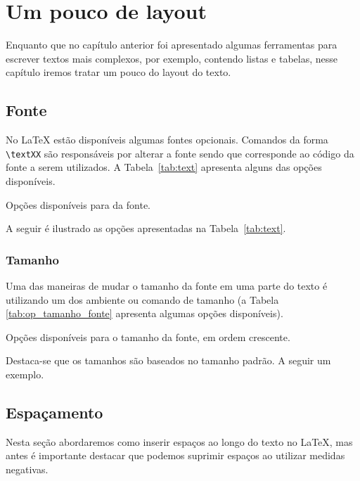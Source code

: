 \chapter{Um pouco de layout}
Enquanto que no capítulo anterior foi apresentado algumas ferramentas para
escrever textos mais complexos, por exemplo, contendo listas e tabelas, nesse
capítulo iremos tratar um pouco do layout do texto.

\section{Fonte}
No LaTeX estão disponíveis algumas fontes opcionais. Comandos da
forma \lstinline!\textXX! são responsáveis por alterar a fonte sendo que
 corresponde ao código da fonte a serem utilizados. A
Tabela~\ref{tab:text} apresenta alguns das opções disponíveis.
\begin{table}[!htb]
  \centering
  \caption{Opções disponíveis para  da fonte.} \label{tab:text}
  
\end{table}

A seguir é ilustrado as opções apresentadas na Tabela~\ref{tab:text}. \\

\subsection{Tamanho}
Uma das maneiras de mudar o tamanho da fonte em uma parte
do texto é utilizando um dos ambiente  ou comando de tamanho (a Tabela
\ref{tab:op_tamanho_fonte} apresenta algumas opções disponíveis).
\begin{table}[h!tb]
  \centering
  \caption{Opções disponíveis para o tamanho da fonte, em ordem crescente.}
  \label{tab:op_tamanho_fonte}
  
\end{table}

Destaca-se que os tamanhos são baseados no tamanho padrão. A seguir um exemplo.
\\

\section{Espaçamento}
Nesta seção abordaremos como inserir espaços ao longo
do texto no LaTeX, mas antes é importante destacar que podemos suprimir espaços
ao utilizar medidas negativas.

